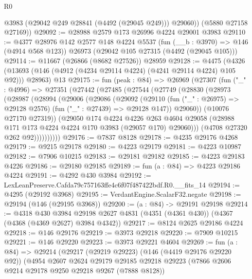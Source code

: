 \begin{lexlean}{R0}
\begin{coremodule}
          @3983
          (@29042 @249 @28841 (@4492 (@29045 @249)))
          @29060))
      (@5880 @27158 @27169))
@29092 := @28988 @2579 @173 @26996 @4224 @29001 @3983
@29110 := @4377
    @28976
    @142
    @2577
    @148
    @4224
    @5537
    (fun (__b : @3970) => @146 (@4914 @568 @123))
    @26973
    (@29042 @105 @27315 (@4492 (@29045 @105)))
@29114 := @11667 (@26866 (@8682 @27526)) @28959
@29128 := @4475
    (@4326 (@13693 (@146 (@4912 (@4234 @29114 @4224) (@4241 @29114 @4224) @105 @92))) @28963)
    @13
@29175 := fun (peak : @84) =>
  @26969
    (@27307
      (fun ("_" : @4996) =>
      @27351
        (@27442
          (@27485
            (@27544
              (@27749
                (@28830
                  (@28973
                    (@28987
                      (@28994
                        (@29006
                          (@29086
                            (@29092
                              (@29110
                                (fun ("_" : @26975) => @29128 @2576)
                                (fun ("_" : @27439) => @29128 @147))
                              @29060))
                          (@10076 @27170 @27319))
                        (@29050
                          @174
                          @4224
                          @4226
                          @263
                          @4604
                          @29058
                          (@28988 @171 @173 @4224 @4224 @170 @3983 (@29057 @170) @29060)))
                      (@4708 @27320 @262 @92))))))))))
@29176 := @7837 @8128
@29178 := @4235 @29176 @4268
@29179 := @9215 @29178
@29180 := @4223 @29179
@29181 := @4223 @10987
@29182 := @7906 @10215
@29183 := @29181 @29182
@29185 := @4223 @29183 @4226
@29186 := @29180 @29185
@29189 := fun (a : @84) => @4223 @29186 @4224
@29191 := @4292 @430 @3984
@29192 := LexLeanPreserve.Cafda79c757163ffe4c6f07f487422bdf.R0.__fits_14
@29194 := @4295 (@29192 @3968)
@29195 := VerdantEngine.ScalarF32.negate
@29198 := @29194 (@146 (@29195 @3968))
@29200 := (a : @84) -> @29191 @29198
@29214 := @4318
    @430
    @3984
    @29198
    @2627
    @4831
    (@4351 (@4361 @430))
    (@4367 (@4368 (@4369 @2627) @3984 @4342))
@29217 := @8124 @2625 @29186 @4224
@29218 := @146 @29176
@29219 := @3973 @29218
@29220 := @7909 @10215
@29221 := @146 @29220
@29223 := @3973 @29221 @4604
@29269 := fun (a : @84) =>
  @29214
    (@29217
      (@29219 @29223)
      (@146 (@4419 @29176 @29220 @92))
      (@4954
        @2607
        @2624
        @29179
        @29185
        @29218
        @29223
        (@7866 @2606 @9214 @29178 @9250 @29218 @9267 (@7888 @8128))

\end{coremodule}
\end{lexlean}
